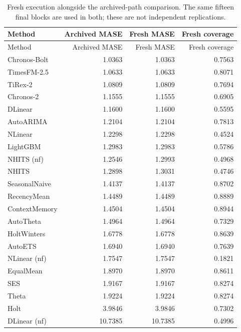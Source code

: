 \begin{longtable}{lrrr}
\caption{Fresh execution alongside the archived-path comparison. The same fifteen final blocks are used in both; these are not independent replications.}\label{tab:fresh-results}\\
\toprule Method & Archived MASE & Fresh MASE & Fresh coverage\\\midrule\endfirsthead
\toprule Method & Archived MASE & Fresh MASE & Fresh coverage\\\midrule\endhead
Chronos-Bolt & 1.0363 & 1.0363 & 0.7563 \\
TimesFM-2.5 & 1.0633 & 1.0633 & 0.8071 \\
TiRex-2 & 1.0809 & 1.0809 & 0.7694 \\
Chronos-2 & 1.1555 & 1.1555 & 0.6905 \\
DLinear & 1.1600 & 1.1600 & 0.5595 \\
AutoARIMA & 1.2104 & 1.2104 & 0.7813 \\
NLinear & 1.2298 & 1.2298 & 0.4524 \\
LightGBM & 1.2983 & 1.2983 & 0.5786 \\
NHITS (nf) & 1.2546 & 1.2993 & 0.4968 \\
NHITS & 1.2898 & 1.3031 & 0.4746 \\
SeasonalNaive & 1.4137 & 1.4137 & 0.8702 \\
RecencyMean & 1.4489 & 1.4489 & 0.8889 \\
ContextMemory & 1.4504 & 1.4504 & 0.8944 \\
AutoTheta & 1.4964 & 1.4964 & 0.7329 \\
HoltWinters & 1.6778 & 1.6778 & 0.8639 \\
AutoETS & 1.6940 & 1.6940 & 0.7639 \\
NLinear (nf) & 1.7547 & 1.7547 & 0.1821 \\
EqualMean & 1.8970 & 1.8970 & 0.8611 \\
SES & 1.9167 & 1.9167 & 0.8274 \\
Theta & 1.9224 & 1.9224 & 0.8274 \\
Holt & 3.9846 & 3.9846 & 0.7302 \\
DLinear (nf) & 10.7385 & 10.7385 & 0.4996 \\
\bottomrule\end{longtable}
